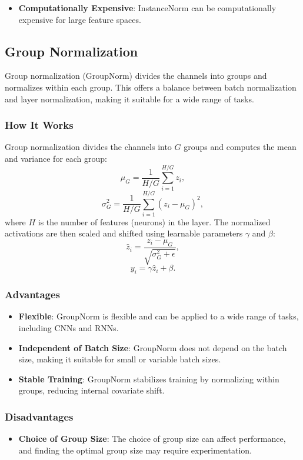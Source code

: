 \begin{notechapter}
\begin{itemize}
    \item \textbf{Computationally Expensive}:
    InstanceNorm can be computationally expensive for large feature spaces.
\end{itemize}

\subsection{Group Normalization}
Group normalization (GroupNorm) divides the channels into groups and
normalizes within each group. This offers a balance between batch
normalization and layer normalization, making it suitable for a wide
range of tasks.

\subsubsection{How It Works}
Group normalization divides the channels into \(G\) groups and computes
the mean and variance for each group:
\[
\mu_G = \frac{1}{H/G} \sum_{i=1}^{H/G} z_i,
\]
\[
\sigma_G^2 = \frac{1}{H/G} \sum_{i=1}^{H/G} (z_i - \mu_G)^2,
\]
where \(H\) is the number of features (neurons) in the layer. The
normalized activations are then scaled and shifted using learnable
parameters \(\gamma\) and \(\beta\):
\[
\hat{z}_i = \frac{z_i - \mu_G}{\sqrt{\sigma_G^2 + \epsilon}},
\]
\[
y_i = \gamma \hat{z}_i + \beta.
\]

\subsubsection{Advantages}
\begin{itemize}
    \item \textbf{Flexible}:
    GroupNorm is flexible and can be applied to a wide range of tasks,
    including CNNs and RNNs.

    \item \textbf{Independent of Batch Size}:
    GroupNorm does not depend on the batch size, making it suitable for
    small or variable batch sizes.

    \item \textbf{Stable Training}:
    GroupNorm stabilizes training by normalizing within groups, reducing
    internal covariate shift.
\end{itemize}

\subsubsection{Disadvantages}
\begin{itemize}
    \item \textbf{Choice of Group Size}:
    The choice of group size can affect performance, and finding the
    optimal group size may require experimentation.


\end{itemize}
\end{notechapter}
